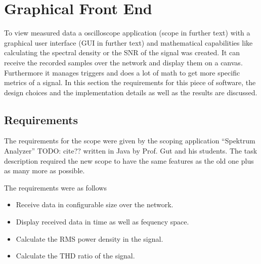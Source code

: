 %
%

\chapter{Graphical Front End} %
\label{ch:graphical_front_end}

To view measured data a oscilloscope application (scope in further text) with a graphical user interface (GUI in further text) and mathematical capabilities like calculating the spectral density or the SNR of the signal was created. It can receive the recorded samples over the network and display them on a canvas. Furthermore it manages triggers and does a lot of math to get more specific metrics of a signal.
In this section the requirements for this piece of software, the design choices and the implementation details as well as the results are discussed.

\section{Requirements}
\label{sec:gui:requirements}

The requirements for the scope were given by the scoping application ``Spektrum Analyzer'' TODO: cite?? written in Java by Prof. Gut and his students.
The task description required the new scope to have the same features as the old one plus as many more as possible.

The requirements were as follows

\begin{itemize}
    \item Receive data in configurable size over the network.
    \item Display received data in time as well as fequency space.
    \item Calculate the RMS power density in the signal.
    \item Calculate the THD ratio of the signal.
\end{itemize}

%
%

